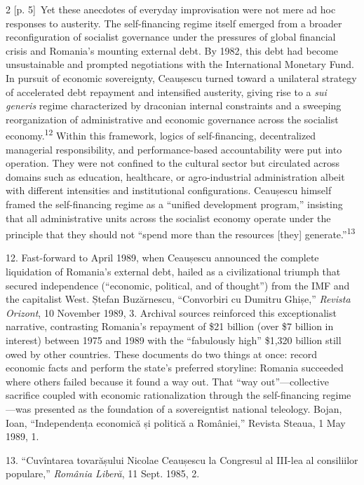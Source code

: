 \documentclass[10pt,a4paper]{article}
\begin{document}
\begin{paracol}{2}
{\scriptsize\color{gray} [p. 5]}\ Yet these anecdotes of everyday improvisation were not mere ad hoc responses to austerity. The self-financing regime itself emerged from a broader reconfiguration of socialist governance under the pressures of global financial crisis and Romania’s mounting external debt. By 1982, this debt had become unsustainable and prompted negotiations with the International Monetary Fund. In pursuit of economic sovereignty, Ceaușescu turned toward a unilateral strategy of accelerated debt repayment and intensified austerity, giving rise to a \textit{sui generis} regime characterized by draconian internal constraints and a sweeping reorganization of administrative and economic governance across the socialist economy.\nobreak\textsuperscript{12} Within this framework, logics of self-financing, decentralized managerial responsibility, and performance-based accountability were put into operation. They were not confined to the cultural sector but circulated across domains such as education, healthcare, or agro-industrial administration albeit with different intensities and institutional configurations. Ceaușescu himself framed the self-financing regime as a “unified development program,” insisting that all administrative units across the socialist economy operate under the principle that they should not “spend more than the resources [they] generate.”\nobreak\textsuperscript{13}\par{\small 12. Fast-forward to April 1989, when Ceaușescu announced the complete liquidation of Romania’s external debt, hailed as a civilizational triumph that secured independence (“economic, political, and of thought”) from the IMF and the capitalist West. Ștefan Buzărnescu, “Convorbiri cu Dumitru Ghișe,” \textit{Revista Orizont}, 10 November 1989, 3. Archival sources reinforced this exceptionalist narrative, contrasting Romania’s repayment of \$21 billion (over \$7 billion in interest) between 1975 and 1989 with the “fabulously high” \$1,320 billion still owed by other countries. These documents do two things at once: record economic facts and perform the state’s preferred storyline: Romania succeeded where others failed because it found a way out. That “way out”—collective sacrifice coupled with economic rationalization through the self-financing regime—was presented as the foundation of a sovereigntist national teleology. Bojan, Ioan, “Independența economică și politică a României,” Revista Steaua, 1 May 1989, 1.\par}{\small 13. “Cuvîntarea tovarășului Nicolae Ceaușescu la Congresul al III-lea al consiliilor populare,” \textit{România Liberă}, 11 Sept. 1985, 2.\par}

\end{paracol}
\end{document}
